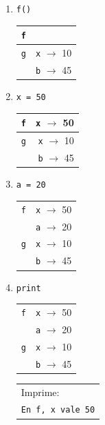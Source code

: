 \begin{enumerate}
\item  \verb|f()   | \hspace{1.5cm}
	\begin{tabular}{r|r|}
	\hline
	\currentframe \verb|f|&\\
	\hline
	\hline
	\verb|g|& \verb|x| $\rightarrow$ 10 \\
	        & \verb|b| $\rightarrow$ 45 \\
	\hline
	\end{tabular}

\item  \verb|x = 50| \hspace{1.5cm}
	\begin{tabular}{r|r|}
	\hline
	\currentframe \verb|f|& \verb|x| $\rightarrow$ 50 \\
	\hline
	\hline
	\verb|g|& \verb|x| $\rightarrow$ 10 \\
	        & \verb|b| $\rightarrow$ 45 \\
	\hline
	\end{tabular}

\item  \verb|a = 20| \hspace{1.5cm}
	\begin{tabular}{r|r|}
	\hline
	\currentframe \verb|f|& \verb|x| $\rightarrow$ 50 \\
	             & \verb|a| $\rightarrow$ 20 \\
	\hline
	\hline
	\verb|g|& \verb|x| $\rightarrow$ 10 \\
	        & \verb|b| $\rightarrow$ 45 \\
	\hline
	\end{tabular}

\item  \verb|print | \hspace{1.5cm}
	\begin{tabular}{r|r|}
	\hline
	\currentframe \verb|f|& \verb|x| $\rightarrow$ 50 \\
	             & \verb|a| $\rightarrow$ 20 \\
	\hline
	\hline
	\verb|g|& \verb|x| $\rightarrow$ 10 \\
	        & \verb|b| $\rightarrow$ 45 \\
	\hline
	\end{tabular}
	\hspace{1cm}
	\begin{tabular}{l}
	Imprime: \\
	{\small\tt En f, x vale 50}
	\end{tabular}


\end{enumerate}

